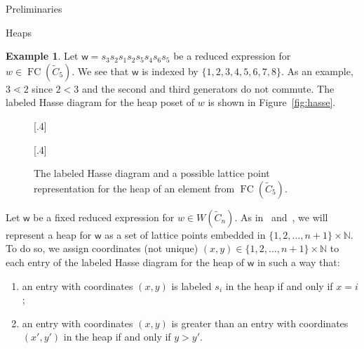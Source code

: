 \documentclass[11pt]{amsart}
\theoremstyle{definition}
\newtheorem{example}[theorem]{Example}
\numberwithin{equation}{section}
\newcommand{\C}{\widetilde{C}}
\renewcommand{\(}{\left(}
\renewcommand{\)}{\right)}
\newcommand{\w}{\mathsf{w}}
\DeclareMathOperator{\FC}{FC}
\newcommand\xxaxis{0}
\newcommand\yyaxis{90}
\newcommand\heapblock[3]{\fill[draw=black, fill=gray!30, rounded corners, line width=1.1pt, shift={(\xxaxis:#1)},shift={(\yyaxis:#2)}] (-1,-0.5) rectangle (1,0.5);\node at (#1,#2) {$#3$};}
\begin{document}
\begin{section}{Preliminaries}
\begin{subsection}{Heaps}
\begin{example}\label{ex:first heap}
Let $\w = s_3 s_2 s_1 s_2 s_5s_{4}s_{6}s_{5}$ be a reduced expression for $w \in \FC(\C_{5})$.  We see that $\w$ is indexed by $\{1, 2, 3, 4, 5, 6, 7, 8\}$.  As an example, $3 \lessdot 2$ since $2 < 3$ and the second and third generators do not commute.  The labeled Hasse diagram for the heap poset of $w$ is shown in Figure~\ref{fig:hasse}.
\end{example}

\begin{figure}[!ht]
\subcaptionbox{\label{fig:hasse}}[.4\textwidth]{ 
}
\subcaptionbox{\label{fig:first heap}}[.4\textwidth]{
}
\caption{The labeled Hasse diagram and a possible lattice point representation for the heap of an element from $\FC(\C_5)$.}
\end{figure}

Let $\w$ be a fixed reduced expression for $w \in W(\C_{n})$.  As in~\cite{Billey2007} and~\cite{Ernst2010}, we will represent a heap for $\w$ as a set of lattice points embedded in $\{1,2,\ldots,n+1\} \times \mathbb{N}$.  To do so, we assign coordinates (not unique) $(x,y) \in \{1,2,\ldots, n+1\} \times \mathbb{N}$ to each entry of the labeled Hasse diagram for the heap of $\w$ in such a way that:
\begin{enumerate}
\item an entry with coordinates $(x,y)$ is labeled $s_i$ in the heap if and only if $x = i$; 
\item an entry with coordinates $(x,y)$ is greater than an entry with coordinates $(x',y')$ in the heap if and only if $y > y'$.
\end{enumerate}


\end{subsection}
\end{section}
\end{document}
